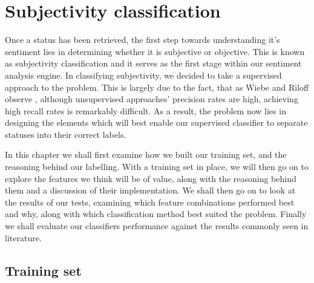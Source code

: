 % 			
% 
% 
% 
% 
% 
% 

% 
% 

\chapter{Subjectivity classification}
\label{subjectivity}

Once a status has been retrieved, the first step towards understanding it's sentiment lies in determining whether it is subjective or objective. This is known as subjectivity classification and it serves as the first stage within our sentiment analysis engine. In classifying subjectivity, we decided to take a supervised approach to the problem. This is largely due to the fact, that as Wiebe and Riloff observe \cite{Wiebe:2003wa}, although unsupervised approaches' precision rates are high, achieving high recall rates is remarkably difficult. As a result, the problem now lies in designing the elements which will best enable our supervised classifier to separate statuses into their correct labels.

In this chapter we shall first examine how we built our training set, and the reasoning behind our labelling. With a training set in place, we will then go on to explore the features we think will be of value, along with the reasoning behind them and a discussion of their implementation. We shall then go on to look at the results of our tests, examining which feature combinations performed best and why, along with which classification method best suited the problem. Finally we shall evaluate our classifiers performance against the results commonly seen in literature.

\section{Training set}
\label{subjectvity:training}

